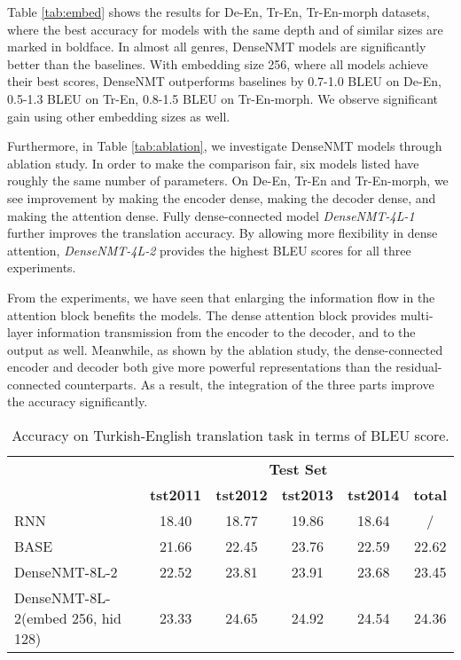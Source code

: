 \documentclass[11pt,a4paper]{article}
\begin{document}
Table \ref{tab:embed} shows the results for De-En, Tr-En, Tr-En-morph datasets, where the best accuracy for models with the same depth and of similar sizes are marked in boldface. In almost all genres, DenseNMT models are significantly better than the baselines. 
With embedding size 256, where all models achieve their best scores, DenseNMT outperforms baselines by 0.7-1.0 BLEU on De-En, 0.5-1.3 BLEU on Tr-En, 0.8-1.5 BLEU on Tr-En-morph. 
We observe significant gain using other embedding sizes as well. 



Furthermore, in Table \ref{tab:ablation}, we investigate DenseNMT models through ablation study. 
In order to make the comparison fair, six models listed have roughly the same number of parameters. 
On De-En, Tr-En and Tr-En-morph, we see improvement by making the encoder dense, making the decoder dense, and making the attention dense. Fully dense-connected model \emph{DenseNMT-4L-1} further improves the translation accuracy. By allowing more flexibility in dense attention, \emph{DenseNMT-4L-2} provides the highest BLEU scores for all three experiments.  


From the experiments, 
we have seen that enlarging the information flow in the attention block benefits the models. The dense attention block provides multi-layer information transmission from the encoder to the decoder, and to the output as well. Meanwhile, as shown by the ablation study, the dense-connected encoder and decoder both give more powerful representations than the residual-connected counterparts. 
As a result, the integration of the three parts improve the accuracy significantly.






\begin{table*}[htbp]
\small
\centering
\captionsetup{font=small}
\begin{tabular}{lccccc}
\toprule
& \multicolumn{5}{c}{\textbf{Test Set}} \\
 & \textbf{tst2011} & \textbf{tst2012} & \textbf{tst2013} & \textbf{tst2014} & \textbf{total}\\
\midrule
RNN \cite{gulcehre2015using} & 18.40 & 18.77 & 19.86 & 18.64 & / \\
\midrule
BASE &21.66 &22.45 &23.76 &22.59 & 22.62 \\
DenseNMT-8L-2 &22.52 &23.81 &23.91 &23.68 & 23.45 \\
DenseNMT-8L-2(embed 256, hid 128) &23.33 & 24.65 & 24.92 & 24.54& 24.36 \\
\bottomrule
\end{tabular}
\caption{Accuracy on Turkish-English translation task in terms of BLEU score.}
\label{tab:tr-en}
\end{table*} 
\end{document}

